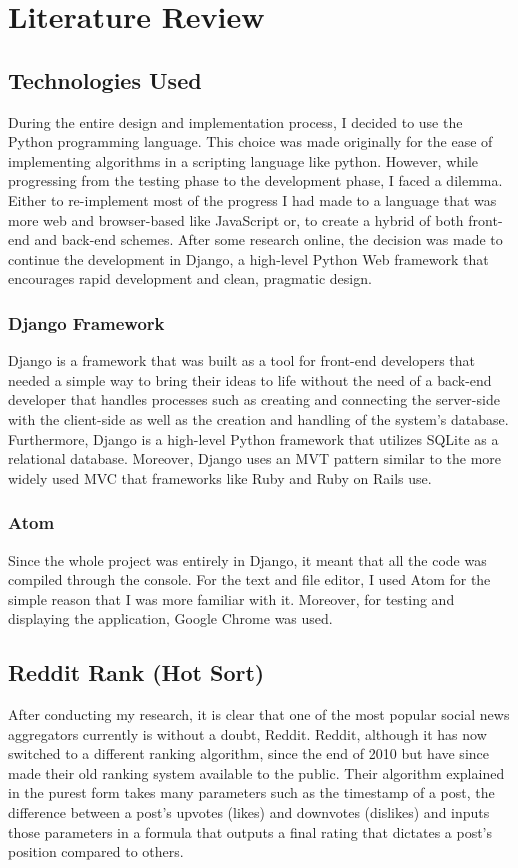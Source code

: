 
\chapter{Literature Review}

\section {Technologies Used}
During the entire design and implementation process, I decided to use the Python programming language. This choice was made originally for the ease of implementing algorithms in a scripting language like python. However, while progressing from the testing phase to the development phase, I faced a dilemma. Either to re-implement most of the progress I had made to a language that was more web and browser-based like JavaScript or, to create a hybrid of both front-end and back-end schemes. After some research online, the decision was made to continue the development in Django, a high-level Python Web framework that encourages rapid development and clean, pragmatic design.

\subsection{Django Framework}
Django is a framework that was built as a tool for front-end developers that needed a simple way to bring their ideas to life without the need of a back-end developer that handles processes such as creating and connecting the server-side with the client-side as well as the creation and handling of the system's database. Furthermore, Django is a high-level Python framework that utilizes SQLite as a relational database. Moreover, Django uses an MVT pattern similar to the more widely used MVC that frameworks like Ruby and Ruby on Rails use.

\subsection {Atom}
Since the whole project was entirely in Django, it meant that all the code was compiled through the console. For the text and file editor, I used Atom for the simple reason that I was more familiar with it. Moreover, for testing and displaying the application, Google Chrome was used.

\section {Reddit Rank (Hot Sort)}
After conducting my research, it is clear that one of the most popular social news aggregators currently is without a doubt, Reddit. Reddit, although it has now switched to a different ranking algorithm, since the end of 2010 but have since made their old ranking system available to the public. Their algorithm explained in the purest form takes many parameters such as the timestamp of a post, the difference between a post’s upvotes (likes) and downvotes (dislikes) and inputs those parameters in a formula that outputs a final rating that dictates a post’s position compared to others.

